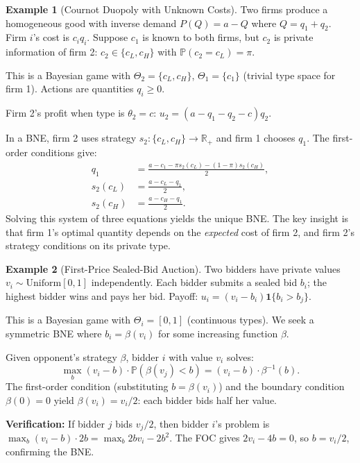 \documentclass[11pt,a4paper]{article}
\theoremstyle{definition}
\newtheorem{example}{Example}[section]
\theoremstyle{plain}
\theoremstyle{remark}
\newcommand{\R}{\mathbb{R}}
\newcommand{\Prob}{\mathbb{P}}
\newcommand{\indicator}{\mathbf{1}}
\begin{document}
\begin{example}[Cournot Duopoly with Unknown Costs]
\label{ex:cournot-bayesian}
Two firms produce a homogeneous good with inverse demand $P(Q) = a - Q$ where
$Q = q_1 + q_2$. Firm $i$'s cost is $c_i q_i$. Suppose $c_1$ is known to both firms, but
$c_2$ is private information of firm 2: $c_2 \in \{c_L, c_H\}$ with
$\Prob(c_2 = c_L) = \pi$.

This is a Bayesian game with $\Theta_2 = \{c_L, c_H\}$, $\Theta_1 = \{c_1\}$ (trivial
type space for firm 1). Actions are quantities $q_i \geq 0$.

Firm 2's profit when type is $\theta_2 = c$: $u_2 = (a - q_1 - q_2 - c)q_2$.

In a BNE, firm 2 uses strategy $s_2 : \{c_L, c_H\} \to \R_+$ and firm 1 chooses $q_1$.
The first-order conditions give:
\begin{align*}
    q_1 &= \frac{a - c_1 - \pi s_2(c_L) - (1-\pi)s_2(c_H)}{2}, \\
    s_2(c_L) &= \frac{a - c_L - q_1}{2}, \\
    s_2(c_H) &= \frac{a - c_H - q_1}{2}.
\end{align*}
Solving this system of three equations yields the unique BNE. The key insight is that
firm 1's optimal quantity depends on the \emph{expected} cost of firm 2, and firm 2's
strategy conditions on its private type.
\end{example}

\begin{example}[First-Price Sealed-Bid Auction]
\label{ex:first-price-auction}
Two bidders have private values $v_i \sim \text{Uniform}[0,1]$ independently. Each bidder
submits a sealed bid $b_i$; the highest bidder wins and pays her bid. Payoff:
$u_i = (v_i - b_i)\indicator\{b_i > b_j\}$.

This is a Bayesian game with $\Theta_i = [0,1]$ (continuous types). We seek a symmetric
BNE where $b_i = \beta(v_i)$ for some increasing function $\beta$.

Given opponent's strategy $\beta$, bidder $i$ with value $v_i$ solves:
\[
    \max_{b} (v_i - b) \cdot \Prob(\beta(v_j) < b)
    = (v_i - b) \cdot \beta^{-1}(b).
\]
The first-order condition (substituting $b = \beta(v_i)$) and the boundary condition
$\beta(0) = 0$ yield $\beta(v_i) = v_i / 2$: each bidder bids half her value.

\textbf{Verification:} If bidder $j$ bids $v_j/2$, then bidder $i$'s problem is
$\max_b (v_i - b) \cdot 2b = \max_b 2bv_i - 2b^2$. The FOC gives $2v_i - 4b = 0$, so
$b = v_i/2$, confirming the BNE.
\end{example}
\end{document}
